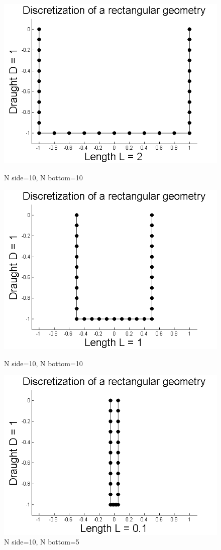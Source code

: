 \documentclass[a4paper,10pt]{article}
\begin{document}
\begin{figure}[!htb]
  \includegraphics[width=\linewidth]{LD=2.png}
  \caption{N side=10, N bottom=10}\label{LD2}
\endminipage\hfill
{}
  \includegraphics[width=\linewidth]{LD=1.png}
  \caption{N side=10, N bottom=10}\label{LD1}
\endminipage\hfill
{}%
  \includegraphics[width=\linewidth]{LD=01.png}
  \caption{N side=10, N bottom=5}\label{LD0.1}
\endminipage
\end{figure}
\end{document}
